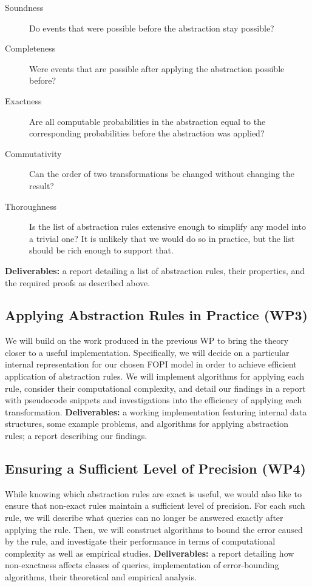 \documentclass[11pt,english,twocolumn]{article}
\begin{document}
\begin{description}
\item[Soundness] Do events that were possible before the abstraction stay
  possible?
\item[Completeness] Were events that are possible after applying the abstraction
  possible before?
\item[Exactness] Are all computable probabilities in the abstraction equal to
  the corresponding probabilities before the abstraction was applied?
\item[Commutativity] Can the order of two transformations be changed without
  changing the result?
\item[Thoroughness] Is the list of abstraction rules extensive enough to
  simplify any model into a trivial one? It is unlikely that we would do so in
  practice, but the list should be rich enough to support that.
\end{description}

\textbf{Deliverables:} a report detailing a list of abstraction rules, their
properties, and the required proofs as described above.

\subsection*{Applying Abstraction Rules in Practice (WP3)}

We will build on the work produced in the previous WP to bring the theory closer
to a useful implementation. Specifically, we will decide on a particular
internal representation for our chosen FOPI model in order to achieve efficient
application of abstraction rules. We will implement algorithms for applying each
rule, consider their computational complexity, and detail our findings in a
report with pseudocode snippets and investigations into the efficiency of
applying each transformation. \textbf{Deliverables:} a working implementation
featuring internal data structures, some example problems, and algorithms for
applying abstraction rules; a report describing our findings.

\subsection*{Ensuring a Sufficient Level of Precision (WP4)}

While knowing which abstraction rules are exact is useful, we would also
like to ensure that non-exact rules maintain a sufficient level of precision.
For each such rule, we will describe what queries can no longer be answered
exactly after applying the rule. Then, we will construct algorithms to bound the
error caused by the rule, and investigate their performance in terms of
computational complexity as well as empirical studies. \textbf{Deliverables:} a
report detailing how non-exactness affects classes of queries, implementation of
error-bounding algorithms, their theoretical and empirical analysis.
\end{document}
